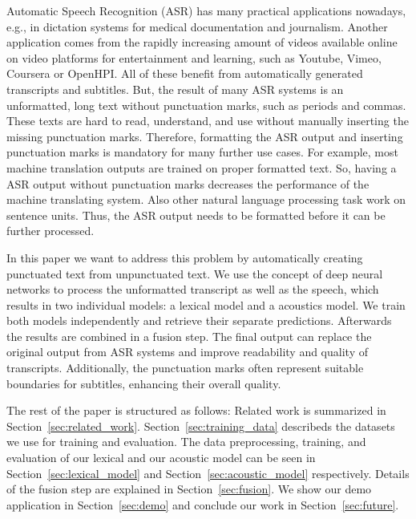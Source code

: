 Automatic Speech Recognition (ASR) has many practical applications nowadays, e.g., in dictation systems for medical documentation and journalism.
Another application comes from the rapidly increasing amount of videos available online on video platforms for entertainment and learning, such as Youtube, Vimeo, Coursera or OpenHPI.
All of these benefit from automatically generated transcripts and subtitles.
But, the result of many ASR systems is an unformatted, long text without punctuation marks, such as periods and commas.
These texts are hard to read, understand, and use without manually inserting the missing punctuation marks.
Therefore, formatting the ASR output and inserting punctuation marks is mandatory for many further use cases.
For example, most machine translation outputs are trained on proper formatted text.
So, having a ASR output without punctuation marks decreases the performance of the machine translating system.
Also other natural language processing task work on sentence units.
Thus, the ASR output needs to be formatted before it can be further processed.

In this paper we want to address this problem by automatically creating punctuated text from unpunctuated text.
We use the concept of deep neural networks to process the unformatted transcript as well as the speech, which results in two individual models: a lexical model and a acoustics model.
We train both models independently and retrieve their separate predictions.
Afterwards the results are combined in a fusion step.
The final output can replace the original output from ASR systems and improve readability and quality of transcripts.
Additionally, the punctuation marks often represent suitable boundaries for subtitles, enhancing their overall quality.

The rest of the paper is structured as follows:
Related work is summarized in Section~\ref{sec:related_work}.
Section~\ref{sec:training_data} describeds the datasets we use for training and evaluation.
The data preprocessing, training, and evaluation of our lexical and our acoustic model can be seen in Section~\ref{sec:lexical_model} and Section~\ref{sec:acoustic_model} respectively.
Details of the fusion step are explained in Section~\ref{sec:fusion}.
We show our demo application in Section~\ref{sec:demo} and conclude our work in Section~\ref{sec:future}.
